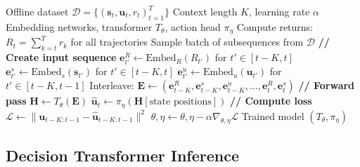 \begin{algorithm}[H]
\caption{Decision Transformer Training}
\begin{algorithmic}[1]
\Require Offline dataset $\mathcal{D} = \{(\mathbf{s}_t, \mathbf{u}_t, r_t)_{t=1}^T\}$
\Require Context length $K$, learning rate $\alpha$
\Require Embedding networks, transformer $T_\theta$, action head $\pi_\eta$
\State Compute returns: $R_t = \sum_{k=t}^T r_k$ for all trajectories
    \State Sample batch of subsequences from $\mathcal{D}$
        \State \textbf{// Create input sequence}
        \State $\mathbf{e}^R_{t'} \gets \text{Embed}_R(R_{t'})$ for $t' \in [t-K, t]$
        \State $\mathbf{e}^s_{t'} \gets \text{Embed}_s(\mathbf{s}_{t'})$ for $t' \in [t-K, t]$
        \State $\mathbf{e}^u_{t'} \gets \text{Embed}_u(\mathbf{u}_{t'})$ for $t' \in [t-K, t-1]$
        \State Interleave: $\mathbf{E} \gets (\mathbf{e}^R_{t-K}, \mathbf{e}^s_{t-K}, \mathbf{e}^u_{t-K}, \ldots, \mathbf{e}^R_t, \mathbf{e}^s_t)$
        \State \textbf{// Forward pass}
        \State $\mathbf{H} \gets T_\theta(\mathbf{E})$ 
        \State $\hat{\mathbf{u}}_t \gets \pi_\eta(\mathbf{H}[\text{state positions}])$ 
        \State \textbf{// Compute loss}
        \State $\mathcal{L} \gets \|\mathbf{u}_{t-K:t-1} - \hat{\mathbf{u}}_{t-K:t-1}\|^2$
    \EndFor
    \State $\theta, \eta \gets \theta, \eta - \alpha \nabla_{\theta,\eta} \mathcal{L}$
\EndFor
\State \Return Trained model $(T_\theta, \pi_\eta)$
\end{algorithmic}
\end{algorithm}

\subsection{Decision Transformer Inference}

